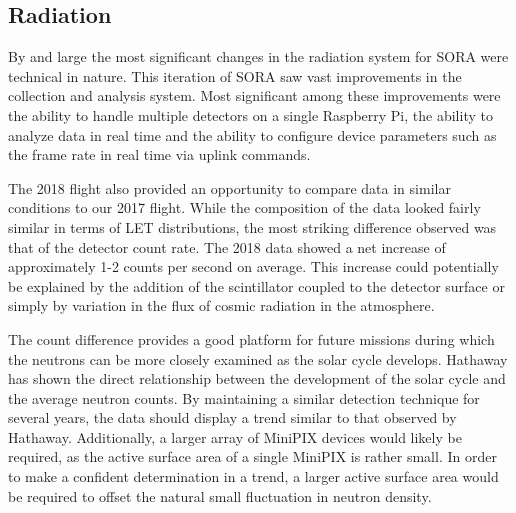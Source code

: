 \subsection{Radiation}
\label{sec:Radiation Results Discussion}
By and large the most significant changes in the radiation system for SORA were technical in nature. This iteration of SORA saw vast improvements in the collection and analysis system. Most significant among these improvements were the ability to handle multiple detectors on a single Raspberry Pi, the ability to analyze data in real time and the ability to configure device parameters such as the frame rate in real time via uplink commands.

The 2018 flight also provided an opportunity to compare data in similar conditions to our 2017 flight. While the composition of the data looked fairly similar in terms of LET distributions, the most striking difference observed was that of the detector count rate. The 2018 data showed a net increase of approximately 1-2 counts per second on average. This increase could potentially be explained by the addition of the scintillator coupled to the detector surface or simply by variation in the flux of cosmic radiation in the atmosphere.

The count difference provides a good platform for future missions during which the neutrons can be more closely examined as the solar cycle develops. Hathaway \cite{SolarCycle} has shown the direct relationship between the development of the solar cycle and the average neutron counts. By maintaining a similar detection technique for several years, the data should display a trend similar to that observed by Hathaway. Additionally, a larger array of MiniPIX devices would likely be required, as the active surface area of a single MiniPIX is rather small. In order to make a confident determination in a trend, a larger active surface area would be required to offset the natural small fluctuation in neutron density.
